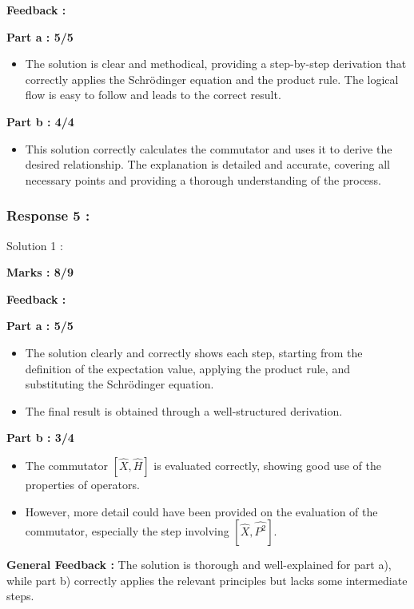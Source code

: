\documentclass[a4paper,11pt]{article}
\begin{document}
\textbf{Feedback :}

\textbf{Part a : 5/5}

\begin{itemize}
    \item The solution is clear and methodical, providing a step-by-step derivation that correctly applies the Schrödinger equation and the product rule. The logical flow is easy to follow and leads to the correct result.
\end{itemize}


\textbf{Part b : 4/4}

\begin{itemize}
    \item This solution correctly calculates the commutator and uses it to derive the desired relationship. The explanation is detailed and accurate, covering all necessary points and providing a thorough understanding of the process.
\end{itemize}



\subsubsection*{Response 5 :}

Solution 1 :

\textbf{Marks : 8/9}

\textbf{Feedback :}

\textbf{Part a : 5/5}

\begin{itemize}
    \item The solution clearly and correctly shows each step, starting from the definition of the expectation value, applying the product rule, and substituting the Schrödinger equation.
    \item The final result is obtained through a well-structured derivation.
\end{itemize}


\textbf{Part b : 3/4}

\begin{itemize}
    \item The commutator $[\hat{X}, \hat{H}]$ is evaluated correctly, showing good use of the properties of operators.
    \item However, more detail could have been provided on the evaluation of the commutator, especially the step involving $[\hat{X}, \hat{P^2}]$.
\end{itemize}

\textbf{General Feedback :}
The solution is thorough and well-explained for part a), while part b) correctly applies the relevant principles but lacks some intermediate steps.
\end{document}
